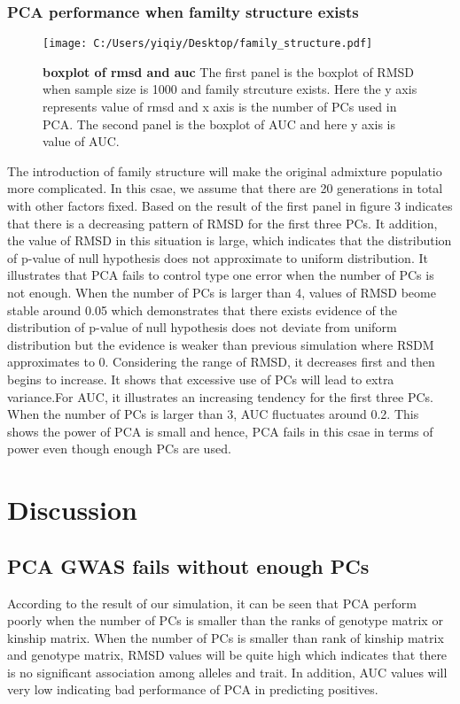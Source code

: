 \documentclass[12pt]{article}
\begin{document}
\subsubsection{PCA performance when familty structure exists}
\begin{figure}[bp!]
  \centering
  \texttt{[image: C:/Users/yiqiy/Desktop/family\_structure.pdf]}
  \caption{
    {\bf boxplot of rmsd and auc}
    The first panel is the boxplot of RMSD when sample size is 1000 and family strcuture exists. Here the y axis represents value of rmsd and x axis is the number of PCs used in PCA.
    The second panel is the boxplot of AUC and here y axis is value of AUC.}
  \label{fig:example}
\end{figure}
The introduction of family structure will make the original admixture populatio more complicated. In this csae, we assume that there are 20 generations in total with other factors fixed. Based on the result of the first panel in figure 3 indicates that there is a decreasing pattern of RMSD for the first three PCs. It addition, the value of RMSD in this situation is large, which indicates that the distribution of p-value of null hypothesis does not approximate to uniform distribution. It illustrates that PCA fails to control type one error when the number of PCs is not enough. When the number of PCs is larger than 4, values of RMSD beome stable around 0.05 which demonstrates that there exists evidence of the distribution of p-value of null hypothesis does not deviate from uniform distribution but the evidence is weaker than previous simulation where RSDM approximates to 0. Considering the range of RMSD, it decreases first and then begins to increase. It shows that excessive use of PCs will lead to extra variance.For AUC, it illustrates an increasing tendency for the first three PCs. When the number of PCs is larger than 3, AUC fluctuates around 0.2. This shows the power of PCA is small and hence, PCA fails in this csae in terms of power even though enough PCs are used. 


\section{Discussion}
\subsection{PCA GWAS fails without enough PCs}
According to the result of our simulation, it can be seen that PCA perform poorly when the number of PCs is smaller than the ranks of genotype matrix or kinship matrix. When the number of PCs is smaller than rank of kinship matrix and genotype matrix, RMSD values will be quite high which indicates that there is no significant association among alleles and trait. In addition, AUC values will very low indicating bad performance of PCA in predicting positives. 
\end{document}
